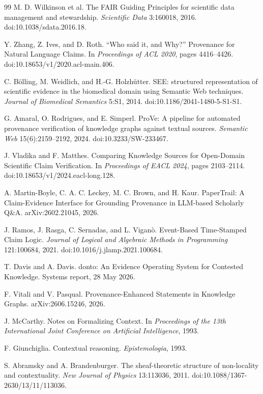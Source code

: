 \documentclass[11pt]{article}
\begin{document}
\begin{thebibliography}{99}
 M. D. Wilkinson et al. The FAIR Guiding Principles for scientific data management and stewardship. \emph{Scientific Data} 3:160018, 2016. doi:10.1038/sdata.2016.18.

 Y. Zhang, Z. Ives, and D. Roth. ``Who said it, and Why?'' Provenance for Natural Language Claims. In \emph{Proceedings of ACL 2020}, pages 4416--4426. doi:10.18653/v1/2020.acl-main.406.

 C. B\"olling, M. Weidlich, and H.-G. Holzh\"utter. SEE: structured representation of scientific evidence in the biomedical domain using Semantic Web techniques. \emph{Journal of Biomedical Semantics} 5:S1, 2014. doi:10.1186/2041-1480-5-S1-S1.

 G. Amaral, O. Rodrigues, and E. Simperl. ProVe: A pipeline for automated provenance verification of knowledge graphs against textual sources. \emph{Semantic Web} 15(6):2159--2192, 2024. doi:10.3233/SW-233467.

 J. Vladika and F. Matthes. Comparing Knowledge Sources for Open-Domain Scientific Claim Verification. In \emph{Proceedings of EACL 2024}, pages 2103--2114. doi:10.18653/v1/2024.eacl-long.128.

 A. Martin-Boyle, C. A. C. Leckey, M. C. Brown, and H. Kaur. PaperTrail: A Claim-Evidence Interface for Grounding Provenance in LLM-based Scholarly Q\&A. arXiv:2602.21045, 2026.

 J. Ramos, J. Rasga, C. Sernadas, and L. Vigan\`o. Event-Based Time-Stamped Claim Logic. \emph{Journal of Logical and Algebraic Methods in Programming} 121:100684, 2021. doi:10.1016/j.jlamp.2021.100684.

 T. Davis and A. Davis. donto: An Evidence Operating System for Contested Knowledge. Systems report, 28 May 2026.

 F. Vitali and V. Pasqual. Provenance-Enhanced Statements in Knowledge Graphs. arXiv:2606.15246, 2026.

 J. McCarthy. Notes on Formalizing Context. In \emph{Proceedings of the 13th International Joint Conference on Artificial Intelligence}, 1993.

 F. Giunchiglia. Contextual reasoning. \emph{Epistemologia}, 1993.

 S. Abramsky and A. Brandenburger. The sheaf-theoretic structure of non-locality and contextuality. \emph{New Journal of Physics} 13:113036, 2011. doi:10.1088/1367-2630/13/11/113036.


\end{thebibliography}
\end{document}
